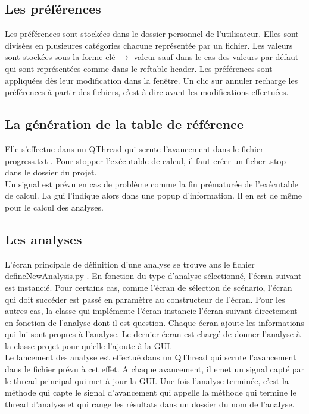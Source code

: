 \documentclass[12pt,a4paper]{article}
\begin{document}
    \subsection{Les préférences}
        Les préférences sont stockées dans le dossier personnel de
        l'utilisateur. Elles sont divisées en plusieures catégories chacune
        représentée par un fichier. Les valeurs sont stockées sous la forme clé
        $\rightarrow$ valeur sauf dans le cas des valeurs par défaut qui sont
        représentées comme dans le reftable header. Les préférences sont
        appliquées dès leur modification dans la fenêtre. Un clic sur annuler
        recharge les préférences à partir des fichiers, c'est à dire avant les
        modifications effectuées.
        

    \subsection{La génération de la table de référence}
        Elle s'effectue dans un QThread qui scrute l'avancement dans le fichier
        progress.txt . Pour stopper l'exécutable de calcul, il faut créer un
        ficher .stop dans le dossier du projet.\\

        Un signal est prévu en cas de problème comme la fin prématurée de
        l'exécutable de calcul. La gui l'indique alors dans une popup
        d'information.  Il en est de même pour le calcul des analyses.


    \subsection{Les analyses}
        L'écran principale de définition d'une analyse se trouve ans le fichier
        defineNewAnalysis.py . En fonction du type d'analyse sélectionné,
        l'écran suivant est instancié. Pour certains cas, comme l'écran de
        sélection de scénario, l'écran qui doit succéder est passé en paramètre
        au constructeur de l'écran. Pour les autres cas, la classe qui
        implémente l'écran instancie l'écran suivant directement en fonction de
        l'analyse dont il est question. Chaque écran ajoute les informations qui
        lui sont propres à l'analyse. Le dernier écran est chargé de donner
        l'analyse à la classe projet pour qu'elle l'ajoute à la GUI.\\

        Le lancement des analyse est effectué dans un QThread qui scrute
        l'avancement dans le fichier prévu à cet effet. A chaque avancement, il
        emet un signal capté par le thread principal qui met à jour la GUI. Une
        fois l'analyse terminée, c'est la méthode qui capte le signal
        d'avancement qui appelle la méthode qui termine le thread d'analyse et
        qui range les résultats dans un dossier du nom de l'analyse.
\end{document}
